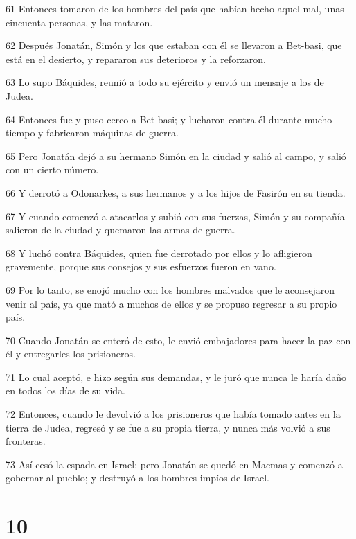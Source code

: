 \par 61 Entonces tomaron de los hombres del país que habían hecho aquel mal, unas cincuenta personas, y las mataron.
\par 62 Después Jonatán, Simón y los que estaban con él se llevaron a Bet-basi, que está en el desierto, y repararon sus deterioros y la reforzaron.
\par 63 Lo supo Báquides, reunió a todo su ejército y envió un mensaje a los de Judea.
\par 64 Entonces fue y puso cerco a Bet-basi; y lucharon contra él durante mucho tiempo y fabricaron máquinas de guerra.
\par 65 Pero Jonatán dejó a su hermano Simón en la ciudad y salió al campo, y salió con un cierto número.
\par 66 Y derrotó a Odonarkes, a sus hermanos y a los hijos de Fasirón en su tienda.
\par 67 Y cuando comenzó a atacarlos y subió con sus fuerzas, Simón y su compañía salieron de la ciudad y quemaron las armas de guerra.
\par 68 Y luchó contra Báquides, quien fue derrotado por ellos y lo afligieron gravemente, porque sus consejos y sus esfuerzos fueron en vano.
\par 69 Por lo tanto, se enojó mucho con los hombres malvados que le aconsejaron venir al país, ya que mató a muchos de ellos y se propuso regresar a su propio país.
\par 70 Cuando Jonatán se enteró de esto, le envió embajadores para hacer la paz con él y entregarles los prisioneros.
\par 71 Lo cual aceptó, e hizo según sus demandas, y le juró que nunca le haría daño en todos los días de su vida.
\par 72 Entonces, cuando le devolvió a los prisioneros que había tomado antes en la tierra de Judea, regresó y se fue a su propia tierra, y nunca más volvió a sus fronteras.
\par 73 Así cesó la espada en Israel; pero Jonatán se quedó en Macmas y comenzó a gobernar al pueblo; y destruyó a los hombres impíos de Israel.

\chapter{10}


